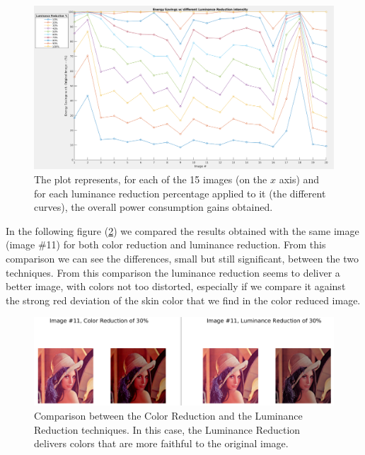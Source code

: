 \documentclass[a4paper]{article}
\begin{document}
            \begin{figure}[htp]
                \centering
                \includegraphics[width=0.8 \columnwidth]{./screenshots/LuminanceReductionOverall}
                \caption{
                        \label{fig:LuminanceReductionOverall}
                        The plot represents, for each of the 15 images (on the $x$ axis) and for each luminance reduction percentage applied to it (the different curves), the overall power consumption gains obtained.
                }
            \end{figure}

            In the following figure (\ref{fig:img11_COLvLUM}) we compared the results obtained with the same image (image \#11) for both color reduction and luminance reduction. From this comparison we can see the differences, small but still significant, between the two techniques. From this comparison the luminance reduction seems to deliver a better image, with colors not too distorted, especially if we compare it against the strong red deviation of the skin color that we find in the color reduced image.

            \begin{figure}[htp]
                \centering
                \includegraphics[width=0.6 \columnwidth]{./screenshots/img11_COLvLUM}
                \caption{
                        \label{fig:img11_COLvLUM}
                        Comparison between the Color Reduction and the Luminance Reduction techniques. In this case, the Luminance Reduction delivers colors that are more faithful to the original image.
                }
            \end{figure}
\end{document}
